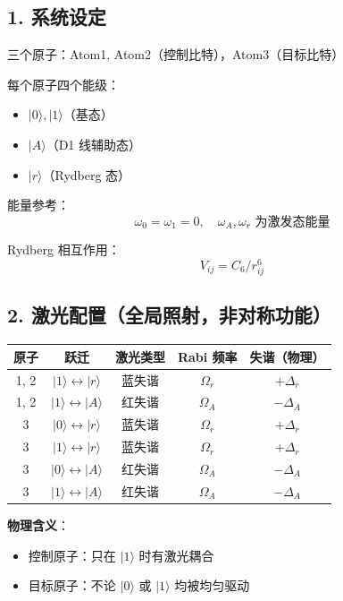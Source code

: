 \documentclass[12pt]{article}
\begin{document}
	\subsection*{1. 系统设定}
	三个原子：Atom1, Atom2（控制比特），Atom3（目标比特）
	
	每个原子四个能级：
	\begin{itemize}
		\item $|0\rangle, |1\rangle$（基态）
		\item $|A\rangle$（D1 线辅助态）
		\item $|r\rangle$（Rydberg 态）
	\end{itemize}
	
	能量参考：
	\begin{equation}
		\omega_0 = \omega_1 = 0,\quad \omega_A, \omega_r \text{ 为激发态能量}
	\end{equation}
	
	Rydberg 相互作用：
	\begin{equation}
		V_{ij} = C_6 / r_{ij}^6
	\end{equation}
	
	\subsection*{2. 激光配置（全局照射，非对称功能）}
	\begin{center}
		\begin{tabular}{|c|c|c|c|c|}
			\hline
			原子 & 跃迁 & 激光类型 & Rabi 频率 & 失谐（物理） \\
			\hline
			1, 2 & $|1\rangle \leftrightarrow |r\rangle$ & 蓝失谐 & $\Omega_r$ & $+\Delta_r$ \\
			1, 2 & $|1\rangle \leftrightarrow |A\rangle$ & 红失谐 & $\Omega_A$ & $-\Delta_A$ \\
			3 & $|0\rangle \leftrightarrow |r\rangle$ & 蓝失谐 & $\Omega_r$ & $+\Delta_r$ \\
			3 & $|1\rangle \leftrightarrow |r\rangle$ & 蓝失谐 & $\Omega_r$ & $+\Delta_r$ \\
			3 & $|0\rangle \leftrightarrow |A\rangle$ & 红失谐 & $\Omega_A$ & $-\Delta_A$ \\
			3 & $|1\rangle \leftrightarrow |A\rangle$ & 红失谐 & $\Omega_A$ & $-\Delta_A$ \\
			\hline
		\end{tabular}
	\end{center}
	
	\textbf{物理含义}：
	\begin{itemize}
		\item 控制原子：只在 $|1\rangle$ 时有激光耦合
		\item 目标原子：不论 $|0\rangle$ 或 $|1\rangle$ 均被均匀驱动
	\end{itemize}
	
\end{document}
